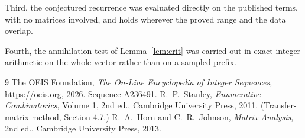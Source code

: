 \documentclass[11pt,a4paper]{article}
\theoremstyle{plain}
\theoremstyle{definition}
\begin{document}
Third, the conjectured recurrence was evaluated directly on the published terms, with no
matrices involved, and holds wherever the proved range and the data overlap.

Fourth, the annihilation test of Lemma~\ref{lem:crit} was carried out in exact integer
arithmetic on the whole vector rather than on a sampled prefix.

\begin{thebibliography}{9}
 The OEIS Foundation, \emph{The On-Line Encyclopedia of Integer
Sequences}, \url{https://oeis.org}, 2026. Sequence A236491.
 R.~P.~Stanley, \emph{Enumerative Combinatorics}, Volume 1, 2nd ed.,
Cambridge University Press, 2011. (Transfer-matrix method, Section 4.7.)
 R.~A.~Horn and C.~R.~Johnson, \emph{Matrix Analysis}, 2nd ed., Cambridge
University Press, 2013.
\end{thebibliography}
\end{document}
